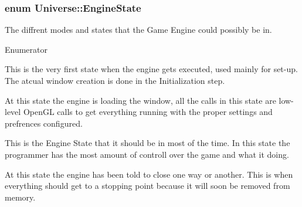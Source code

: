 \subsubsection[{Engine\+State}]{\setlength{\rightskip}{0pt plus 5cm}enum {\bf Universe\+::\+Engine\+State}}\label{classUniverse_a9a3907e0a49d7e91098163238ef50505}
The diffrent modes and states that the Game Engine could possibly be in. \begin{Desc}
\item[Enumerator]\par
\begin{description}
\item[{\em 
\hypertarget{classUniverse_a9a3907e0a49d7e91098163238ef50505a2ccf20ffb4fe4beb8d5f01e138ad4e72}{}S\+T\+A\+R\+T\+I\+N\+G\label{classUniverse_a9a3907e0a49d7e91098163238ef50505a2ccf20ffb4fe4beb8d5f01e138ad4e72}
}]This is the very first state when the engine gets executed, used mainly for set-\/up. The atcual window creation is done in the Initialization step. \item[{\em 
\hypertarget{classUniverse_a9a3907e0a49d7e91098163238ef50505ae8454679e33e08f1a27b6cf469155c3a}{}I\+N\+I\+T\+I\+A\+L\+I\+Z\+I\+N\+G\label{classUniverse_a9a3907e0a49d7e91098163238ef50505ae8454679e33e08f1a27b6cf469155c3a}
}]At this state the engine is loading the window, all the calls in this state are low-\/level Open\+G\+L calls to get everything running with the proper settings and prefrences configured. \item[{\em 
\hypertarget{classUniverse_a9a3907e0a49d7e91098163238ef50505a291f8ef62e9f213687e37c52a41b49b5}{}R\+U\+N\+N\+I\+N\+G\label{classUniverse_a9a3907e0a49d7e91098163238ef50505a291f8ef62e9f213687e37c52a41b49b5}
}]This is the Engine State that it should be in most of the time. In this state the programmer has the most amount of controll over the game and what it doing. \item[{\em 
\hypertarget{classUniverse_a9a3907e0a49d7e91098163238ef50505a09af4dbe08a6b4c30e16ca60dc814f03}{}S\+T\+O\+P\+I\+N\+G\label{classUniverse_a9a3907e0a49d7e91098163238ef50505a09af4dbe08a6b4c30e16ca60dc814f03}
}]At this state the engine has been told to close one way or another. This is when everything should get to a stopping point because it will soon be removed from memory. \end{description}
\end{Desc}


